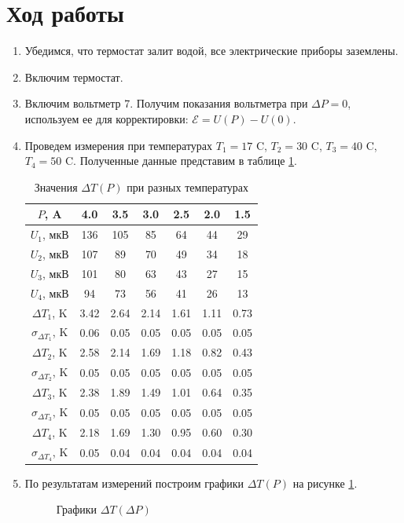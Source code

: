 \documentclass[12pt]{article}
\begin{document}
    \section{Ход работы}
    \begin{enumerate}
        \item Убедимся, что термостат залит водой, все электрические приборы
        заземлены.
        \item Включим термостат.
        \item Включим вольтметр 7. Получим показания вольтметра при $\Delta P = 0$,
        используем ее для корректировки: $\mathscr{E} = U(P) - U(0)$.
        \item Проведем измерения при температурах $T_1 = 17$ \textdegree C,
        $T_2 = 30$ \textdegree C, $T_3 = 40$ \textdegree C, $T_4 = 50$ \textdegree C.
        Полученные данные представим в таблице \ref{tabT}.
        \begin{table}[h]
            \centering
            \begin{tabular}{|c|c|c|c|c|c|c|}
            \hline
            $P$, A   & 4.0  & 3.5  & 3.0  & 2.5  & 2.0  & 1.5  \\ \hline
            $U_1$, мкВ  & 136  & 105  & 85   & 64   & 44   & 29   \\ \hline
            $U_2$, мкВ  & 107  & 89   & 70   & 49   & 34   & 18   \\ \hline
            $U_3$, мкВ  & 101  & 80   & 63   & 43   & 27   & 15   \\ \hline
            $U_4$, мкВ  & 94   & 73   & 56   & 41   & 26   & 13   \\ \hline
            $\Delta T_1$, K  & 3.42 & 2.64 & 2.14 & 1.61 & 1.11 & 0.73 \\ \hline
            $\sigma_{\Delta T_1}$, K & 0.06 & 0.05 & 0.05 & 0.05 & 0.05 & 0.05 \\ \hline
            $\Delta T_2$, K  & 2.58 & 2.14 & 1.69 & 1.18 & 0.82 & 0.43 \\ \hline
            $\sigma_{\Delta T_2}$, K & 0.05 & 0.05 & 0.05 & 0.05 & 0.05 & 0.05 \\ \hline
            $\Delta T_3$, K  & 2.38 & 1.89 & 1.49 & 1.01 & 0.64 & 0.35 \\ \hline
            $\sigma_{\Delta T_3}$, K & 0.05 & 0.05 & 0.05 & 0.05 & 0.05 & 0.05 \\ \hline
            $\Delta T_4$, K  & 2.18 & 1.69 & 1.30 & 0.95 & 0.60 & 0.30 \\ \hline
            $\sigma_{\Delta T_4}$, K & 0.05 & 0.04 & 0.04 & 0.04 & 0.04 & 0.04 \\ \hline
            \end{tabular}
            \caption{Значения $\Delta T(P)$ при разных температурах}
            \label{tabT}
        \end{table}
        \item По результатам измерений построим графики $\Delta T(P)$ на рисунке
        \ref{graphT}.
        \begin{figure}[h]
            \centering
            
            \caption{Графики $\Delta T(\Delta P)$}
            \label{graphT}
        \end{figure}


\end{enumerate}
\end{document}
